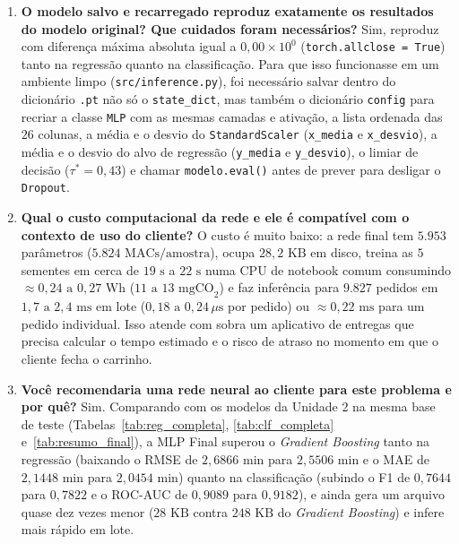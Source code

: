 \documentclass[12pt,a4paper]{article}
\begin{document}
\begin{enumerate}
    \item[(d)] \textbf{O modelo salvo e recarregado reproduz exatamente os resultados do modelo original? Que cuidados foram necessários?}
    Sim, reproduz com diferença máxima absoluta igual a $0{,}00 \times 10^0$ (\texttt{torch.allclose = True}) tanto na regressão quanto na classificação. Para que isso funcionasse em um ambiente limpo (\texttt{src/inference.py}), foi necessário salvar dentro do dicionário \texttt{.pt} não só o \texttt{state\_dict}, mas também o dicionário \texttt{config} para recriar a classe \texttt{MLP} com as mesmas camadas e ativação, a lista ordenada das $26$ colunas, a média e o desvio do \texttt{StandardScaler} (\texttt{x\_media} e \texttt{x\_desvio}), a média e o desvio do alvo de regressão (\texttt{y\_media} e \texttt{y\_desvio}), o limiar de decisão ($\tau^* = 0{,}43$) e chamar \texttt{modelo.eval()} antes de prever para desligar o \texttt{Dropout}.

    \item[(e)] \textbf{Qual o custo computacional da rede e ele é compatível com o contexto de uso do cliente?}
    O custo é muito baixo: a rede final tem $5.953$ parâmetros ($5.824\text{ MACs/amostra}$), ocupa $28{,}2\text{ KB}$ em disco, treina as $5$ sementes em cerca de $19\text{ s}$ a $22\text{ s}$ numa CPU de notebook comum consumindo $\approx 0{,}24\text{ a } 0{,}27\text{ Wh}$ ($11\text{ a } 13\text{ mgCO}_2$) e faz inferência para $9.827$ pedidos em $1{,}7\text{ a } 2{,}4\text{ ms}$ em lote ($0{,}18\text{ a } 0{,}24\,\mu\text{s}$ por pedido) ou $\approx 0{,}22\text{ ms}$ para um pedido individual. Isso atende com sobra um aplicativo de entregas que precisa calcular o tempo estimado e o risco de atraso no momento em que o cliente fecha o carrinho.

    \item[(f)] \textbf{Você recomendaria uma rede neural ao cliente para este problema e por quê?}
    Sim. Comparando com os modelos da Unidade 2 na mesma base de teste (Tabelas~\ref{tab:reg_completa}, \ref{tab:clf_completa} e~\ref{tab:resumo_final}), a MLP Final superou o \textit{Gradient Boosting} tanto na regressão (baixando o RMSE de $2{,}6866\text{ min}$ para $2{,}5506\text{ min}$ e o MAE de $2{,}1448\text{ min}$ para $2{,}0454\text{ min}$) quanto na classificação (subindo o F1 de $0{,}7644$ para $0{,}7822$ e o ROC-AUC de $0{,}9089$ para $0{,}9182$), e ainda gera um arquivo quase dez vezes menor ($28\text{ KB}$ contra $248\text{ KB}$ do \textit{Gradient Boosting}) e infere mais rápido em lote.
\end{enumerate}
\end{document}
